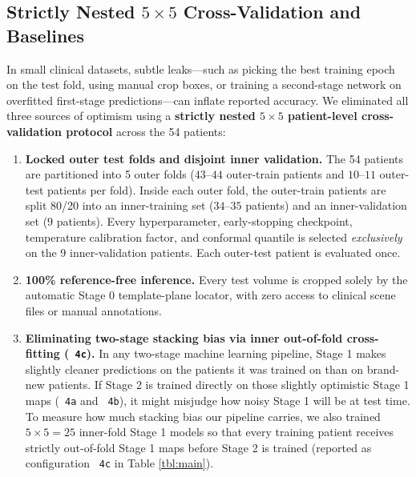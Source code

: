 \documentclass[
  11pt,
]{article}
\providecommand{\tightlist}{%
  \setlength{\itemsep}{0pt}\setlength{\parskip}{0pt}}
\let\nforigtexttt\texttt
\renewcommand{\texttt}[1]{\nforigtexttt{\XeTeXinterchartokenstate=1 #1}}
\begin{document}
\subsection{\texorpdfstring{Strictly Nested \(5 \times 5\)
Cross-Validation and
Baselines}{Strictly Nested 5 \textbackslash times 5 Cross-Validation and Baselines}}\label{strictly-nested-5-times-5-cross-validation-and-baselines}

In small clinical datasets, subtle leaks---such as picking the best
training epoch on the test fold, using manual crop boxes, or training a
second-stage network on overfitted first-stage predictions---can inflate
reported accuracy. We eliminated all three sources of optimism using a
\textbf{strictly nested \(5 \times 5\) patient-level cross-validation
protocol} across the 54 patients:

\begin{enumerate}
\def\labelenumi{\arabic{enumi}.}
\tightlist
\item
  \textbf{Locked outer test folds and disjoint inner validation.} The 54
  patients are partitioned into 5 outer folds (\(43\text{--}44\)
  outer-train patients and \(10\text{--}11\) outer-test patients per
  fold). Inside each outer fold, the outer-train patients are split
  80/20 into an inner-training set (\(34\text{--}35\) patients) and an
  inner-validation set (\(9\) patients). Every hyperparameter,
  early-stopping checkpoint, temperature calibration factor, and
  conformal quantile is selected \emph{exclusively} on the 9
  inner-validation patients. Each outer-test patient is evaluated once.
\item
  \textbf{100\% reference-free inference.} Every test volume is cropped
  solely by the automatic Stage 0 template-plane locator, with zero
  access to clinical scene files or manual annotations.
\item
  \textbf{Eliminating two-stage stacking bias via inner out-of-fold
  cross-fitting (\texttt{4c}).} In any two-stage machine learning
  pipeline, Stage 1 makes slightly cleaner predictions on the patients
  it was trained on than on brand-new patients. If Stage 2 is trained
  directly on those slightly optimistic Stage 1 maps (\texttt{4a} and
  \texttt{4b}), it might misjudge how noisy Stage 1 will be at test
  time. To measure how much stacking bias our pipeline carries, we also
  trained \(5 \times 5 = 25\) inner-fold Stage 1 models so that every
  training patient receives strictly out-of-fold Stage 1 maps before
  Stage 2 is trained (reported as configuration \texttt{4c} in Table
  \ref{tbl:main}).
\end{enumerate}
\end{document}
